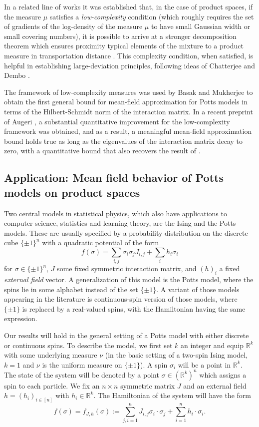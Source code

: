 \documentclass[12pt]{article}
\def \RR {\mathbb R}
\theoremstyle{definition}
\theoremstyle{remark}
\begin{document}
In a related line of works it was established that, in the case of product spaces, if the measure $\mu$ satisfies a \emph{low-complexity} condition (which roughly requires the set of gradients of the log-density of the measure $\mu$ to have small Gaussian width or small covering numbers), it is possible to arrive at a stronger decomposition theorem which ensures proximity typical elements of the mixture to a product measure in transportation distance \cite{Eldan-GWComplexity, Austin-decomp, EldanGross-Decomp}. This complexity condition, when satisfied, is helpful in establishing large-deviation principles, following ideas of Chatterjee and Dembo \cite{CD14}. 

The framework of low-complexity measures was used by Basak and Mukherjee \cite{BM16} to obtain the first general bound for mean-field approximation for Potts models in terms of the Hilbert-Schmidt norm of the interaction matrix. In a recent preprint of Augeri \cite{Aug18}, a substantial quantitative improvement for the low-complexity framework was obtained, and as a result, a meaningful mean-field approximation bound holds true as long as the eigenvalues of the interaction matrix decay to zero, with a quantitative bound that also recovers the result of \cite{JKR18}.


\subsection{Application: Mean field behavior of Potts models on product spaces}

Two central models in statistical physics, which also have applications to computer science, statistics and learning theory, are the Ising and the Potts models. These are usually specified by a probability distribution on the discrete cube $\{\pm 1\}^n$ with a quadratic potential of the form
$$
f(\sigma) = \sum_{i,j} \sigma_i \sigma_j J_{i,j} + \sum_i h_i \sigma_i
$$
for $\sigma \in \{\pm 1\}^n$, $J$ some fixed symmetric interaction matrix, and $(h)_i$ a fixed {\it external field} vector. A generalization of this model is the Potts model, where the spins lie in some alphabet instead of the set $\{\pm 1\}$. A variant of those models appearing in the literature is continuous-spin version of those models, where $\{\pm 1\}$ is replaced by a real-valued spins, with the Hamiltonian having the same expression.

Our results will hold in the general setting of a Potts model with either discrete or continuous spins. To describe the model, we first set $k$ an integer and equip $\RR^k$ with some underlying measure $\nu$ (in the basic setting of a two-spin Ising model, $k=1$ and $\nu$ is the uniform measure on $\{\pm 1\}$). A spin $\sigma_i$ will be a point in $\RR^k$. The state of the system will be denoted by a point $\sigma \in (\RR^k)^n$ which assigns a spin to each particle. We fix an $n \times n$ symmetric matrix $J$ and an external field $h = (h_i)_{i \in [n]}$ with $h_i \in \RR^k$. The Hamiltonian of the system will have the form
\begin{equation}\label{eq:hamiltonian}
f(\sigma) = f_{J,h}(\sigma) := \sum_{j,i=1}^{n} J_{i,j} \sigma_i \cdot \sigma_j  + \sum_{i=1}^n h_i \cdot \sigma_i.
\end{equation}
 
\end{document}

